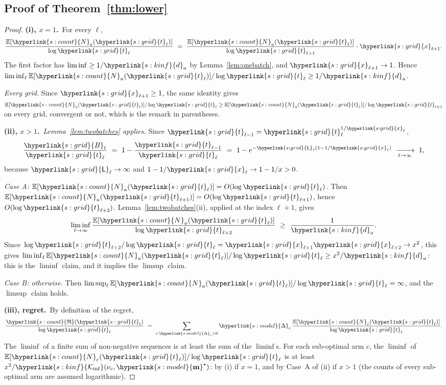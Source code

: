 \documentclass[10pt]{article}
\newcommand{\sy}[2]{{\hyperlink{#1}{#2}}}
\newcommand{\E}{\mathbb{E}}
\newcommand{\1}{\mathbf{1}}
\newcommand{\m}{\sy{s:model}{\mathbf{m}}}
\newcommand{\Dg}{\sy{s:model}{\Delta}}
\newcommand{\Ki}{\sy{s:kinf}{\mathcal K_{\inf}}}
\newcommand{\da}{\sy{s:kinf}{d}_a}
\newcommand{\Ng}{\sy{s:count}{N}}
\newcommand{\Reg}{\sy{s:count}{\mathfrak R}}
\newcommand{\tl}{\sy{s:grid}{t}}
\newcommand{\Lg}{\sy{s:grid}{\mathsf L}}
\newcommand{\xg}{\sy{s:grid}{x}}
\newcommand{\Bg}{\sy{s:grid}{B}}
\begin{document}
\subsection{Proof of Theorem~\ref{thm:lower}}\label{sec:app-lb-assembly}
\begin{proof}
\par\medskip\noindent\textbf{(i), $x=1$.}\  For every $\ell$,
\[
\frac{\E[\Ng_a(\tl_\ell)]}{\log\tl_\ell}\ =\ \frac{\E[\Ng_a(\tl_\ell)]}{\log\tl_{\ell+1}}\cdot\xg_{\ell+1} .
\]
The first factor has $\liminf\ge1/\da$ by Lemma~\ref{lem:onebatch}, and $\xg_{\ell+1}\to1$. Hence $\liminf_\ell\E[\Ng_a(\tl_\ell)]/\log\tl_\ell\ge1/\da$.

\noindent\emph{Every grid.} Since $\xg_{\ell+1}\ge1$, the same identity gives $\E[\Ng_a(\tl_\ell)]/\log\tl_\ell\ge\E[\Ng_a(\tl_\ell)]/\log\tl_{\ell+1}$ on every grid, convergent or not,
which is the remark in parentheses.

\par\medskip\noindent\textbf{(ii), $x>1$.}\  \emph{Lemma~\ref{lem:twobatches} applies.} Since $\tl_{\ell-1}=\tl_\ell^{1/\xg_\ell}$,
\[
\frac{\Bg_\ell}{\tl_\ell}\ =\ 1-\frac{\tl_{\ell-1}}{\tl_\ell}\ =\ 1-e^{-\Lg_\ell(1-1/\xg_\ell)}\ \xrightarrow[\ell\to\infty]{}\ 1,
\]
because $\Lg_\ell\to\infty$ and $1-1/\xg_\ell\to1-1/x>0$.

\noindent\emph{Case A: $\E[\Ng_a(\tl_\ell)]=O(\log\tl_\ell)$.} Then $\E[\Ng_a(\tl_{\ell+1})]=O(\log\tl_{\ell+1})$, hence $O(\log\tl_{\ell+2})$. Lemma~\ref{lem:twobatches}(ii), applied
at the index $\ell+1$, gives
\[
\liminf_{\ell\to\infty}\frac{\E[\Ng_a(\tl_\ell)]}{\log\tl_{\ell+2}}\ \ge\ \frac1{\da} .
\]
Since $\log\tl_{\ell+2}/\log\tl_\ell=\xg_{\ell+1}\xg_{\ell+2}\to x^2$, this gives $\liminf_\ell\E[\Ng_a(\tl_\ell)]/\log\tl_\ell\ge x^2/\da$: this is the $\liminf$ claim, and it implies
the $\limsup$ claim.

\noindent\emph{Case B: otherwise.} Then $\limsup_\ell\E[\Ng_a(\tl_\ell)]/\log\tl_\ell=\infty$, and the $\limsup$ claim holds.

\par\medskip\noindent\textbf{(iii), regret.}\  By definition of the regret,
\[
\frac{\Reg(\tl_\ell)}{\log\tl_\ell}\ =\ \sum_{c:\Dg_c>0}\Dg_c\,\frac{\E[\Ng_c(\tl_\ell)]}{\log\tl_\ell} .
\]
The $\liminf$ of a finite sum of non-negative sequences is at least the sum of the $\liminf$s. For each sub-optimal arm $c$, the $\liminf$ of $\E[\Ng_c(\tl_\ell)]/\log\tl_\ell$
is at least $x^2/\Ki(\nu_c,\m^\star)$: by (i) if $x=1$, and by Case~A of (ii) if $x>1$ (the counts of every sub-optimal arm are assumed logarithmic).

\end{proof}
\end{document}
